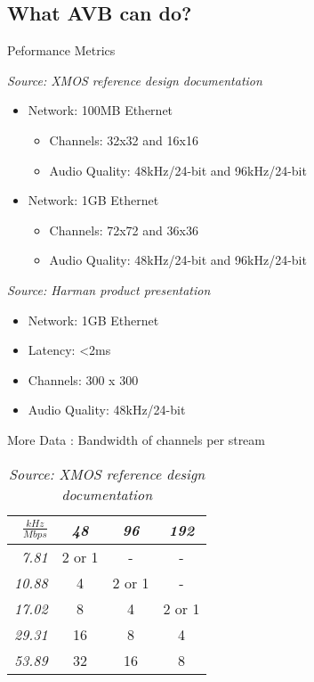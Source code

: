 \documentclass{beamer}
\begin{document}

\subsection{What AVB can do?}

\begin{frame}{ Peformance Metrics }

\emph{Source: XMOS reference design documentation}
\begin{itemize}
	\item Network: 100MB Ethernet
	\begin{itemize}
		\item Channels: 32x32 and 16x16
		\item Audio Quality: 48kHz/24-bit and 96kHz/24-bit
	\end{itemize}
	\item Network: 1GB Ethernet
	\begin{itemize}
		\item Channels: 72x72 and 36x36
		\item Audio Quality: 48kHz/24-bit and 96kHz/24-bit
	\end{itemize}
\end{itemize}

\emph{Source: Harman product presentation}
\begin{itemize}
	\item Network: 1GB Ethernet
	\item Latency: <2ms
	\item Channels: 300 x 300
	\item Audio Quality: 48kHz/24-bit
\end{itemize}


\end{frame}


\begin{frame}{ More Data : Bandwidth of channels per stream }
\begin{table}
\caption{\emph{Source: XMOS reference design documentation}}

\begin{tabular} {| r || c | c | c | } \hline
$\frac{kHz}{Mbps}$ & \emph{48} & \emph{96} & \emph{192} \\ \hline \hline
\emph{7.81} & 2 or 1 &- &- \\ \hline
     \emph{10.88} & 4 & 2 or 1  &- \\ \hline
     \emph{17.02} & 8 & 4 & 2 or 1 \\ \hline
     \emph{29.31} & 16 & 8 & 4 \\ \hline
     \emph{53.89} & 32 & 16 & 8 \\ \hline
\end{tabular}

\end{table}

\end{frame}
\end{document}
